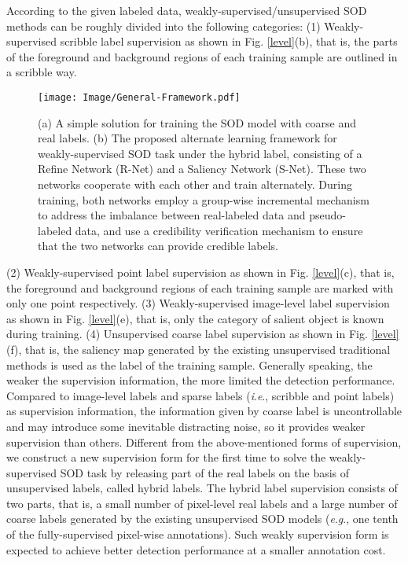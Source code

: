 \documentclass[journal]{IEEEtran}
\newcommand{\ie}{\textit{i}.\textit{e}.}
\newcommand{\eg}{\textit{e}.\textit{g}.}
\begin{document}
According to the given labeled data, weakly-supervised/unsupervised SOD methods can be roughly divided into the following categories:
(1) Weakly-supervised scribble label supervision as shown in Fig. \ref{level}(b), that is, the parts of the foreground and background regions of each training sample are outlined in a scribble way.
\begin{figure}[!t]
    \centering
    \texttt{[image: Image/General-Framework.pdf]}
    \caption{(a) A simple solution for training the SOD model with coarse and real labels. (b) The proposed alternate learning framework for weakly-supervised SOD task under the hybrid label, consisting of a Refine Network (R-Net) and a Saliency Network (S-Net). These two networks cooperate with each other and train alternately. During training, both networks employ a group-wise incremental mechanism to address the imbalance between real-labeled data and pseudo-labeled data, and use a credibility verification mechanism to ensure that the two networks can provide credible labels.
}
    \label{fig:general-framework}
\end{figure}
(2) Weakly-supervised point label supervision as shown in Fig. \ref{level}(c), that is, the foreground and background regions of each training sample are marked with only one point respectively.
(3) Weakly-supervised image-level label supervision as shown in Fig. \ref{level}(e), that is, only the category of salient object is known during training.
(4) Unsupervised coarse label supervision as shown in Fig. \ref{level}(f), that is, the saliency map generated by the existing unsupervised traditional methods is used as the label of the training sample.
Generally speaking, the weaker the supervision information, the more limited the detection performance.
Compared to image-level labels and sparse labels (\ie, scribble and point labels) as supervision information, the information given by coarse label is uncontrollable and may introduce some inevitable distracting noise, so it provides weaker supervision than others.
Different from the above-mentioned forms of supervision, we construct a new supervision form for the first time to solve the weakly-supervised SOD task by releasing part of the real labels on the basis of unsupervised labels, called hybrid labels.
The hybrid label supervision consists of two parts, that is, a small number of pixel-level real labels and a large number of coarse labels generated by the existing unsupervised SOD models (\eg, one tenth of the fully-supervised pixel-wise annotations).
Such weakly supervision form is expected to achieve better detection performance at a smaller annotation cost.
\end{document}
